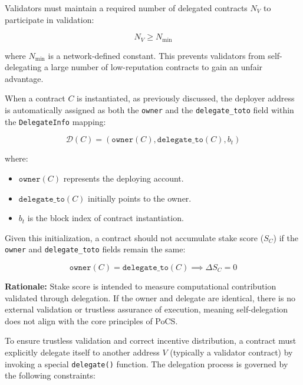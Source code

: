 \documentclass{article}
\begin{document}
Validators must maintain a required number of delegated contracts \( N_V \) to participate in validation:

\begin{equation}
    N_V \geq N_{\text{min}}
\end{equation}

where \( N_{\text{min}} \) is a network-defined constant. This prevents validators from self-delegating a large number of low-reputation contracts to gain an unfair advantage.

When a contract \( C \) is instantiated, as previously discussed, the deployer address is automatically assigned as both the \texttt{owner} and the \texttt{delegate\_toto} field within the \texttt{DelegateInfo} mapping:

\begin{equation}
    \mathcal{D}(C) = (\texttt{owner}(C), \texttt{delegate\_to}(C), b_t)
\end{equation}

\noindent where:
\begin{itemize}
    \item \( \texttt{owner}(C) \) represents the deploying account.
    \item \( \texttt{delegate\_to}(C) \) initially points to the owner.
    \item \( b_t \) is the block index of contract instantiation.
\end{itemize}

Given this initialization, a contract should not accumulate stake score (\( S_C \)) if the \texttt{owner} and \texttt{delegate\_toto} fields remain the same:

\begin{equation}
    \texttt{owner}(C) = \texttt{delegate\_to}(C) \implies \Delta S_C = 0
\end{equation}

\noindent \textbf{Rationale:} Stake score is intended to measure computational contribution validated through delegation. If the owner and delegate are identical, there is no external validation or trustless assurance of execution, meaning self-delegation does not align with the core principles of PoCS.

To ensure trustless validation and correct incentive distribution, a contract must explicitly delegate itself to another address \( V \) (typically a validator contract) by invoking a special \texttt{delegate()} function. The delegation process is governed by the following constraints:
\end{document}
